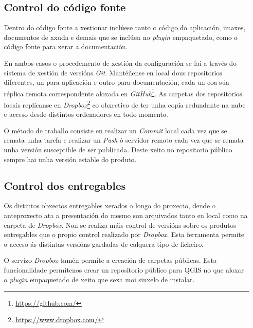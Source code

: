 \subsection{Control do código fonte}
Dentro do código fonte a xestionar inclúese tanto o código do aplicación, imaxes, documentos de axuda e demais que se inclúen no \emph{plugin} empaquetado, como o código fonte para xerar a documentación.

En ambos casos o procedemento de xestión da configuración se fai a través do sistema de xestión de versións \emph{Git}. Mantéñense en local dous repositorios diferentes, un para aplicación e outro para documentación, cada un coa súa réplica remota correspondente aloxada en \emph{GitHub}\footnote{\url{https://github.com/}}. As carpetas dos repositorios locais replícanse en \emph{Dropbox}\footnote{\url{https://www.dropbox.com/}} co obxectivo de ter unha copia redundante na nube e acceso desde distintos ordenadores en todo momento.

O método de traballo consiste en realizar un \emph{Commit} local cada vez que se remata unha tarefa e realizar un \emph{Push} ó servidor remoto cada vez que se remata unha versión susceptible de ser publicada. Deste xeito no repositorio público sempre hai unha versión estable do produto.

\subsection{Control dos entregables}
Os distintos obxectos entregables xerados o longo do proxecto, dende o anteproxecto ata a presentación do mesmo son arquivados tanto en local como na carpeta de \emph{Dropbox}. Non se realiza máis control de versións sobre os produtos entregables que o propio control realizado por \emph{Dropbox}. Esta ferramenta permite o acceso ás distintas versións gardadas de calquera tipo de ficheiro.

O servizo \emph{Dropbox} tamén permite a creación de carpetas públicas. Esta funcionalidade permítenos crear un repositorio público para QGIS no que aloxar o \emph{plugin} empaquetado de xeito que sexa moi sinxelo de instalar.